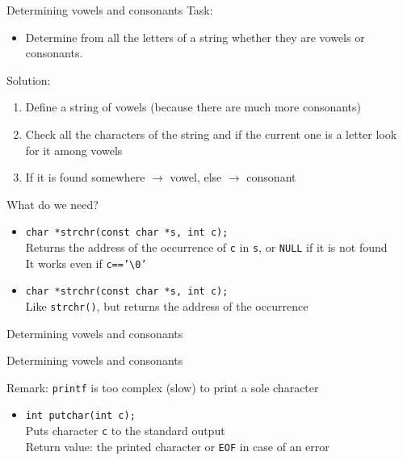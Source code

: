 \documentclass[usenames,dvipsnames,aspectratio=169]{beamer}
\begin{document}
\begin{frame}{Determining vowels and consonants}
  Task:
  \begin{itemize}
    \small
    \item[] Determine from all the letters of a string whether they are vowels or consonants.
  \end{itemize}
  Solution:
  \begin{enumerate}
    \small
    \item Define a string of vowels (because there are much more consonants)
    \item Check all the characters of the string and if the current one is a letter look for it among vowels
    \item If it is found somewhere $\to$ vowel, else $\to$ consonant
  \end{enumerate}
  What do we need?
  \begin{itemize}
    \small
    \item \texttt{char *strchr(const char *s, int c);} \\
      Returns the address of the  occurrence of \texttt{c} in \texttt{s}, or \texttt{NULL} if it is not found \\
      It works even if \texttt{c=='\textbackslash0'}
    \item \texttt{char *strchr(const char *s, int c);} \\
      Like \texttt{strchr()}, but returns the address of the  occurrence
  \end{itemize}
\end{frame}

\begin{frame}{Determining vowels and consonants}
  \begin{exampleblock}{}
    \scriptsize
    
  \end{exampleblock}
\end{frame}

\begin{frame}{Determining vowels and consonants}
  \begin{exampleblock}{}
    
  \end{exampleblock}
  \vfill
  Remark: \texttt{printf} is too complex (slow) to print a sole character
  \begin{itemize}
    \item \texttt{int putchar(int c);} \\
      Puts character \texttt{c} to the standard output \\
      Return value: the printed character or \texttt{EOF} in case of an error
  \end{itemize}
\end{frame}
\end{document}
